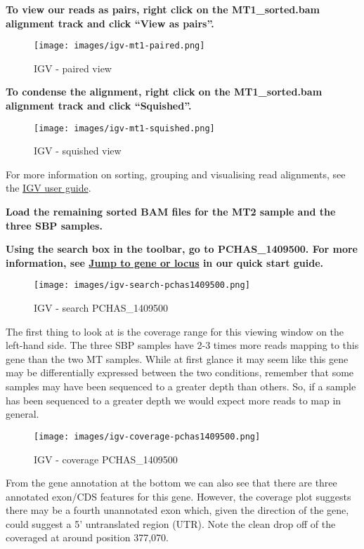 \documentclass[11pt]{article}
\begin{document}
    \textbf{To view our reads as pairs, right click on the MT1\_sorted.bam
alignment track and click ``View as pairs''.}

    \begin{figure}[!h]
\centering
\texttt{[image: images/igv-mt1-paired.png]}
\caption{IGV - paired view}
\end{figure}

    \textbf{To condense the alignment, right click on the MT1\_sorted.bam
alignment track and click ``Squished''.}

    \begin{figure}[!h]
\centering
\texttt{[image: images/igv-mt1-squished.png]}
\caption{IGV - squished view}
\end{figure}

    For more information on sorting, grouping and visualising read
alignments, see the
\href{http://software.broadinstitute.org/software/igv/UserGuide}{IGV
user guide}.

\textbf{Load the remaining sorted BAM files for the MT2 sample and the
three SBP samples.}

\textbf{Using the search box in the toolbar, go to PCHAS\_1409500. For
more information, see
\href{https://github.com/sanger-pathogens/pathogen-informatics-training/blob/master/Notebooks/IGV/index.ipynb}{Jump
to gene or locus} in our quick start guide.}

    \begin{figure}[!h]
\centering
\texttt{[image: images/igv-search-pchas1409500.png]}
\caption{IGV - search PCHAS\_1409500}
\end{figure}

    The first thing to look at is the coverage range for this viewing window
on the left-hand side. The three SBP samples have 2-3 times more reads
mapping to this gene than the two MT samples. While at first glance it
may seem like this gene may be differentially expressed between the two
conditions, remember that some samples may have been sequenced to a
greater depth than others. So, if a sample has been sequenced to a
greater depth we would expect more reads to map in general.

    \begin{figure}[!h]
\centering
\texttt{[image: images/igv-coverage-pchas1409500.png]}
\caption{IGV - coverage PCHAS\_1409500}
\end{figure}

    From the gene annotation at the bottom we can also see that there are
three annotated exon/CDS features for this gene. However, the coverage
plot suggests there may be a fourth unannotated exon which, given the
direction of the gene, could suggest a 5' untranslated region (UTR).
Note the clean drop off of the coveraged at around position 377,070.
\end{document}
